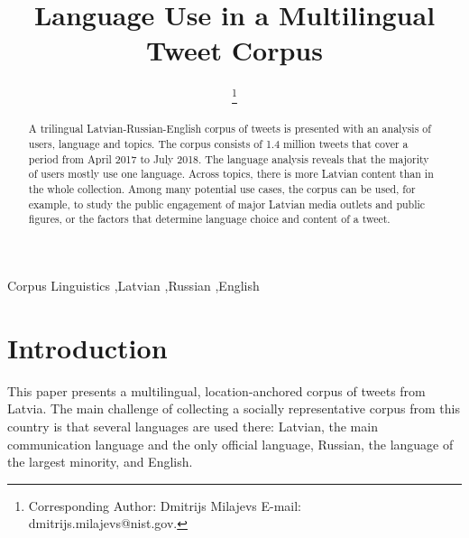 \documentclass{IOS-Book-Article}
\begin{document}
\begin{frontmatter}              %

\title{Language Use in a Multilingual Tweet Corpus}

\author[A]{ %
  \thanks{Corresponding Author: Dmitrijs Milajevs
    E-mail: dmitrijs.milajevs@nist.gov.}}


\address[A]{Guest Researcher at National Institute of Standards and Technology, Maryland, USA}

\begin{abstract}
A trilingual Latvian-Russian-English corpus of tweets is presented with an analysis of users, language and topics. The corpus consists of 1.4 million tweets that cover a period from April 2017 to July 2018. The language analysis reveals that the majority of users mostly use one language. Across topics, there is more Latvian content than in the whole collection. Among many potential use cases, the corpus can be used, for example, to study the public engagement of major Latvian media outlets and public figures, or the factors that determine language choice and content of a tweet.
\end{abstract}

\begin{keyword}
Corpus Linguistics \sep Latvian \sep Russian \sep English
\end{keyword}
\end{frontmatter}

\thispagestyle{empty}
\pagestyle{empty}

\section*{Introduction}

This paper presents a multilingual, location-anchored corpus of tweets from Latvia. The main challenge of collecting a socially representative corpus from this country is that several languages are used there: Latvian, the main communication language and the only official language, Russian, the language of the largest minority, and English.
\end{document}
